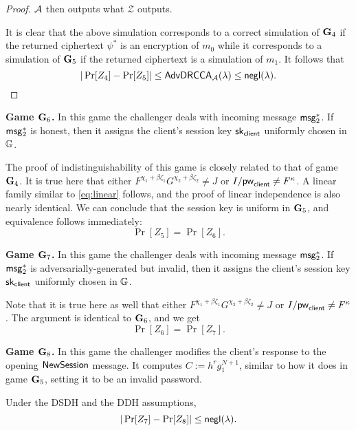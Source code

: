 \begin{proof}
	$\mathcal{A}$ then outputs what $\mathcal{Z}$ outputs.

	It is clear that the above simulation corresponds to a correct simulation of $\mathbf{G}_4$ if the returned ciphertext $\psi^{*}$ is an encryption of $m_0$ while it corresponds to a simulation of $\mathbf{G}_5$ if the returned ciphertext is a simulation of $m_1$. It follows that $$|\Pr[Z_4]-\Pr[Z_5]|\leq\mathsf{AdvDRCCA}_{\mathcal{A}}(\lambda)\leq \mathsf{negl}(\lambda).$$ 
\end{proof}

\textbf{Game $\mathbf{G}_6$.} In this game the challenger deals with incoming message $\mathsf{msg}_{2}^{*}$. If $\mathsf{msg}_{2}^{*}$ is honest, then it assigns the client's session key $\mathsf{sk}_{\mathsf{client}}$ uniformly chosen in $\mathbb{G}$.

The proof of indistinguishability of this game is closely related to that of game $\mathbf{G}_4$. It is true here that either $F^{\chi_1+\beta\zeta_1}G^{\chi_2+\beta\zeta_2}\neq J$ or $I/\mathsf{pw}_{\mathsf{client}}\neq F^\kappa$. A linear family similar to \cref{eq:linear} follows, and the proof of linear independence is also nearly identical. We can conclude that the session key is uniform in $\mathbf{G}_5$, and equivalence follows immediately: $$\Pr[Z_5]=\Pr[Z_6].$$

\textbf{Game $\mathbf{G}_7$.} In this game the challenger deals with incoming message $\mathsf{msg}_{2}^{*}$. If $\mathsf{msg}_{2}^{*}$ is adversarially-generated but invalid, then it assigns the client's session key $\mathsf{sk}_{\mathsf{client}}$ uniformly chosen in $\mathbb{G}$.

Note that it is true here as well that either $F^{\chi_1+\beta\zeta_1}G^{\chi_2+\beta\zeta_2}\neq J$ or $I/\mathsf{pw}_{\mathsf{client}}\neq F^\kappa$. The argument is identical to $\mathbf{G}_6$, and we get $$\Pr[Z_6]=\Pr[Z_7].$$

\textbf{Game $\mathbf{G}_8$.} In this game the challenger modifies the client's response to the opening $\mathsf{NewSession}$ message. It computes $C:=h^{r}g_1^{N+1}$, similar to how it does in game $\mathbf{G}_5$, setting it to be an invalid password. 

\begin{lemma}
	Under the DSDH and the DDH assumptions, $$|\Pr[Z_7]-\Pr[Z_8]|\leq\mathsf{negl}(\lambda).$$
\end{lemma}

